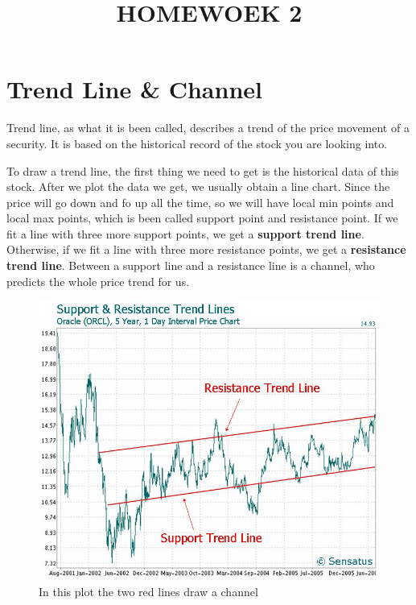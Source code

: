 \documentclass[conference]{IEEEtran}
\begin{document}
\title{HOMEWOEK 2}

\author{
}

\maketitle

\section*{Trend Line \& Channel}
Trend line, as what it is been called, describes a trend of the price movement of a 
security. It is based on the historical record of the stock you are looking into.

To draw a trend line, the first thing we need to get is the historical data of this
stock. After we plot the data we get, we usually obtain a line chart. Since the price 
will go down and fo up all the time, so we will have local min points and local max 
points, which is been called support point and resistance point. If we fit a line with
three more support points, we get a \textbf{support trend line}. Otherwise, if we fit a line with
three more resistance points, we get a \textbf{resistance trend line}. Between a support line and
a resistance line is a channel, who predicts the whole price trend for us.

\begin{figure}[H]
    \centerline{\includegraphics[scale=0.45]{Pic/pic1.jpg}}
    \caption{In this plot the two red lines draw a channel}
\end{figure}
\end{document}
